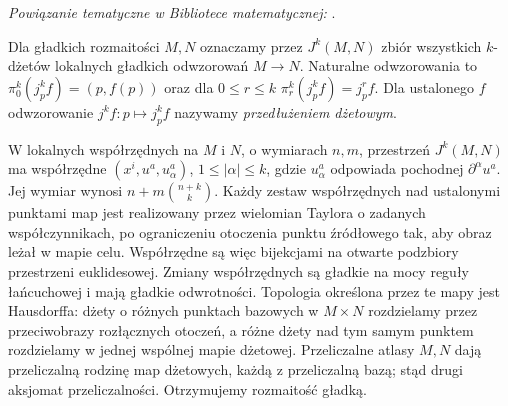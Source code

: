 \noindent\emph{Powiązanie tematyczne w Bibliotece matematycznej:} .

\begin{definicja}
\label{def:dzety-bundle}
Dla gładkich rozmaitości $M,N$ oznaczamy przez $J^k(M,N)$
zbiór wszystkich $k$-dżetów lokalnych gładkich odwzorowań
$M\to N$. Naturalne odwzorowania to
$\pi_0^k(j_p^k f)=(p,f(p))$ oraz dla $0\le r\le k$
$\pi_r^k(j_p^k f)=j_p^r f$.
Dla ustalonego $f$ odwzorowanie $j^kf:p\mapsto j_p^kf$
nazywamy \emph{przedłużeniem dżetowym}.
\end{definicja}

W lokalnych współrzędnych na $M$ i $N$, o wymiarach $n,m$,
przestrzeń $J^k(M,N)$ ma współrzędne $(x^i,u^a,u^a_\alpha)$,
$1\le|\alpha|\le k$, gdzie $u^a_\alpha$ odpowiada pochodnej
$\partial^\alpha u^a$. Jej wymiar wynosi
$n+m\binom{n+k}{k}$. Każdy zestaw współrzędnych nad ustalonymi punktami
map jest realizowany przez wielomian Taylora
o zadanych współczynnikach, po ograniczeniu
otoczenia punktu źródłowego tak, aby obraz leżał
w mapie celu. Współrzędne są więc bijekcjami
na otwarte podzbiory przestrzeni euklidesowej.
Zmiany współrzędnych są gładkie na mocy reguły
łańcuchowej i mają gładkie odwrotności.
Topologia określona przez te mapy jest Hausdorffa:
dżety o różnych punktach bazowych w $M\times N$
rozdzielamy przez przeciwobrazy rozłącznych otoczeń,
a różne dżety nad tym samym punktem rozdzielamy
w jednej wspólnej mapie dżetowej.
Przeliczalne atlasy $M,N$ dają przeliczalną rodzinę
map dżetowych, każdą z przeliczalną bazą; stąd drugi
aksjomat przeliczalności. Otrzymujemy rozmaitość gładką.

